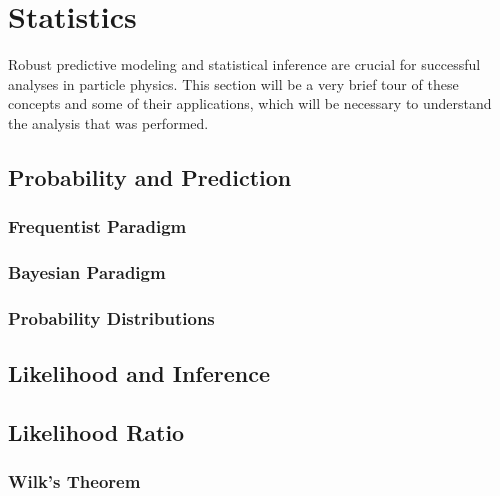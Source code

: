 \section{Statistics}\label{section:statistics}

Robust predictive modeling and statistical inference are crucial for successful analyses in particle physics.
This section will be a very brief tour of these concepts and some of their applications, which will be necessary to understand the analysis that was performed.

\subsection{Probability and Prediction}\label{subsection:probability}

\subsubsection{Frequentist Paradigm}\label{subsubsection:probability_frequentist}

\subsubsection{Bayesian Paradigm}\label{subsubsection:probability_bayesian}

\subsubsection{Probability Distributions}\label{subsubsection:probability_distribution}

\subsection{Likelihood and Inference}\label{subsection:likelihood}

\subsection{Likelihood Ratio}\label{subsection:likelihood_ratio}

\subsubsection{Wilk's Theorem}\label{subsection:wilks_theorem}

